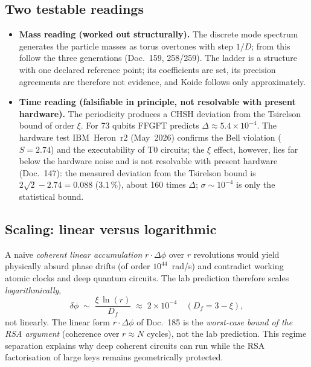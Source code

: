 \subsection{Two testable readings}
\begin{itemize}
  \item \textbf{Mass reading (worked out structurally).} The discrete mode spectrum
  generates the particle masses as torus overtones with step $1/D$; from this
  follow the three generations (Doc.~159, 258/259). The ladder is a structure with
  one declared reference point; its coefficients are set, its precision agreements
  are therefore not evidence, and Koide follows only approximately.
  \item \textbf{Time reading (falsifiable in principle, not resolvable with present hardware).} The
  periodicity produces a CHSH deviation from the Tsirelson bound of order $\xi$.
  For 73 qubits FFGFT predicts $\Delta \approx 5.4\times10^{-4}$. The hardware test IBM~Heron~r2 (May~2026) confirms the
  Bell violation ($S=2.74$) and the executability of T0 circuits; the $\xi$
  effect, however, lies far below the hardware noise and is not resolvable with present hardware
  (Doc.~147): the measured deviation from the Tsirelson bound is
  $2\sqrt2-2.74=0.088$ ($3.1\,\%$), about 160 times $\Delta$; $\sigma\sim10^{-4}$ is
  only the statistical bound.
\end{itemize}

\subsection{Scaling: linear versus logarithmic}

\begin{important}
A naive \emph{coherent linear accumulation} $r\cdot\Delta\phi$ over $r$
revolutions would yield physically absurd phase drifts (of order
$10^{44}$~rad/s) and contradict working atomic clocks and deep quantum circuits.
The lab prediction therefore scales \emph{logarithmically},
\[
  \delta\phi \;\sim\; \frac{\xi\,\ln(r)}{D_f}
  \;\approx\; 2\times10^{-4} \quad (D_f = 3-\xi),
\]
not linearly. The linear form $r\cdot\Delta\phi$ of Doc.~185 is the
\emph{worst-case bound of the RSA argument} (coherence over $r\approx N$ cycles),
not the lab prediction. This regime separation explains why deep coherent
circuits can run while the RSA factorisation of large keys remains geometrically
protected.
\end{important}

